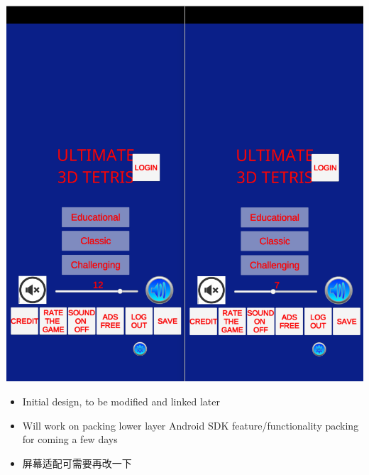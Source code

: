 \documentclass[9pt, b5paper]{article}
\begin{document}
\includegraphics[width=.9\linewidth]{./pic/readme_20221230_174540.png}
\begin{itemize}
\item Initial design, to be modified and linked later
\item Will work on packing lower layer Android SDK feature/functionality packing for coming a few days
\item 屏幕适配可需要再改一下
\end{itemize}
\end{document}
